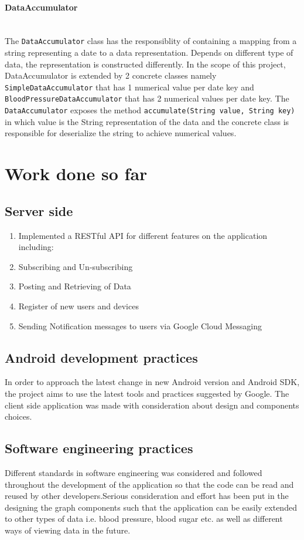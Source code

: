 \paragraph{DataAccumulator}\mbox{} \\
The \texttt{DataAccumulator} class has the responsiblity of containing a mapping from a string representing a date to a
data representation. Depends on different type of data, the representation is constructed differently. In the scope of
this project, DataAccumulator is extended by 2 concrete classes namely \texttt{SimpleDataAccumulator} that has 1
numerical value per date key and \texttt{BloodPressureDataAccumulator} that has 2 numerical values per date key. The
\texttt{DataAccumulator} exposes the method \texttt{accumulate(String value, String key)} in which value is the String
representation of the data and the concrete class is responsible for deserialize the string to achieve numerical values.

\section{Work done so far}
\label{sec:Work done so far}
\subsection{Server side}

\begin{enumerate}
    \item Implemented a RESTful API for different features on the application including:
    \item Subscribing and Un-subscribing
    \item Posting and Retrieving of Data
    \item Register of new users and devices
    \item Sending Notification messages to users via Google Cloud Messaging
\end{enumerate}

\subsection{Android development practices}
In order to approach the latest change in new Android version and Android SDK, the project aims to use the latest tools
and practices suggested by Google. The client side application was made with consideration about design and components
choices.

\subsection{Software engineering practices}
Different standards in software engineering was considered and followed throughout the development of the application so
that the code can be read and reused by other developers.Serious consideration and effort has been put in the designing
the graph components such that the application can be easily extended to other types of data i.e. blood pressure, blood
sugar etc. as well as different ways of viewing data in the future.

